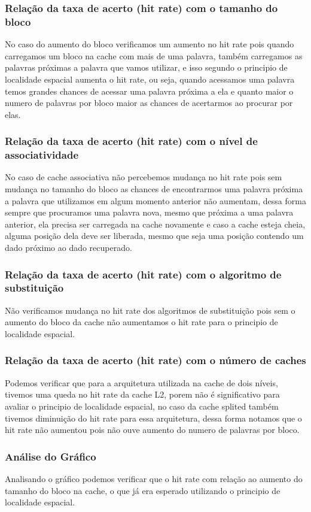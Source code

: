 \documentclass[10pt,a4paper]{article}
\begin{document}
\subsubsection{Relação da taxa de acerto (hit rate) com o tamanho do bloco}
No caso do aumento do bloco verificamos um aumento no hit rate pois quando carregamos um bloco na cache com mais de uma palavra, também carregamos as palavras próximas a palavra que vamos utilizar, e isso segundo o principio de localidade espacial aumenta o hit rate, ou seja, quando acessamos uma palavra temos grandes chances de acessar uma palavra próxima a ela e quanto maior o numero de palavras por bloco maior as chances de acertarmos ao procurar por elas.
\subsubsection{Relação da taxa de acerto (hit rate) com o nível de associatividade}
No caso de cache associativa não percebemos mudança no hit rate pois sem mudança no tamanho do bloco as chances de encontrarmos uma palavra próxima a palavra que utilizamos em algum momento anterior não aumentam, dessa forma sempre que procuramos uma palavra nova, mesmo que próxima a uma palavra anterior, ela precisa ser carregada na cache novamente e caso a cache esteja cheia, alguma posição dela deve ser liberada, mesmo que seja uma posição contendo um dado próximo ao dado recuperado.
\subsubsection{Relação da taxa de acerto (hit rate) com o algoritmo de substituição}
Não verificamos mudança no hit rate dos algoritmos de substituição pois sem o aumento do bloco da cache não aumentamos o hit rate para o principio de localidade espacial.
\subsubsection{Relação da taxa de acerto (hit rate) com o número de caches}
Podemos verificar que para a arquitetura utilizada na cache de dois níveis, tivemos uma queda no hit rate da cache L2, porem não é significativo para avaliar o principio de localidade espacial, no caso da cache splited também tivemos diminuição do hit rate para essa arquitetura, dessa forma notamos que o hit rate não aumentou pois não ouve aumento do numero de palavras por bloco.
\subsubsection{Análise do Gráfico}
Analisando o gráfico podemos verificar que o hit rate com relação ao aumento do tamanho do bloco na cache, o que já era esperado utilizando o principio de localidade espacial.
\end{document}
